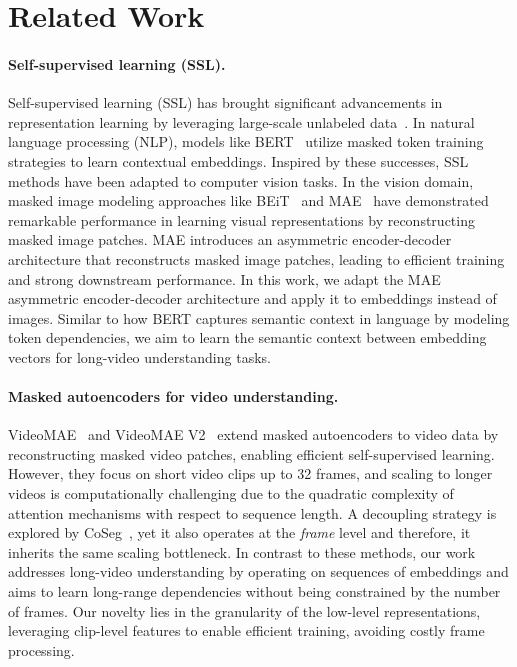 \section{Related Work}
\label{sec:related_work}
\paragraph{Self-supervised learning (SSL).} 
Self-supervised learning (SSL) has brought significant advancements in representation learning by leveraging large-scale unlabeled data~\cite{mikolov2013efficient, radford2018improving, chen2020simple, grill2020bootstrap, caron2021emerging}. In natural language processing (NLP), models like BERT~\cite{devlin2019bert} utilize masked token training strategies to learn contextual embeddings. Inspired by these successes, SSL methods have been adapted to computer vision tasks. In the vision domain, masked image modeling approaches like BEiT~\cite{bao2022beit} and MAE~\cite{he2022masked} have demonstrated remarkable performance in learning visual representations by reconstructing masked image patches. MAE introduces an asymmetric encoder-decoder architecture that reconstructs masked image patches, leading to efficient training and strong downstream performance. In this work, we adapt the MAE asymmetric encoder-decoder architecture and apply it to embeddings instead of images. Similar to how BERT captures semantic context in language by modeling token dependencies, we aim to learn the semantic context between embedding vectors for long-video understanding tasks.
\vspace{-5mm}
\paragraph{Masked autoencoders for video understanding.} VideoMAE~\cite{tong2022videomae} and VideoMAE V2~\cite{wang2023videomae} extend masked autoencoders to video data by reconstructing masked video patches, enabling efficient self-supervised learning. However, they focus on short video clips up to 32 frames, and scaling to longer videos is computationally challenging due to the quadratic complexity of attention mechanisms with respect to sequence length. A decoupling strategy is explored by
CoSeg~\cite{wang2023coseg}, yet it also operates at the \emph{frame} level and therefore, it inherits the same scaling bottleneck. In contrast to these methods, our work addresses long-video understanding by operating on sequences of embeddings and aims to learn long-range dependencies without being constrained by the number of frames. Our novelty lies in the granularity of the low-level representations, leveraging clip-level features to enable efficient training, avoiding costly frame processing.

